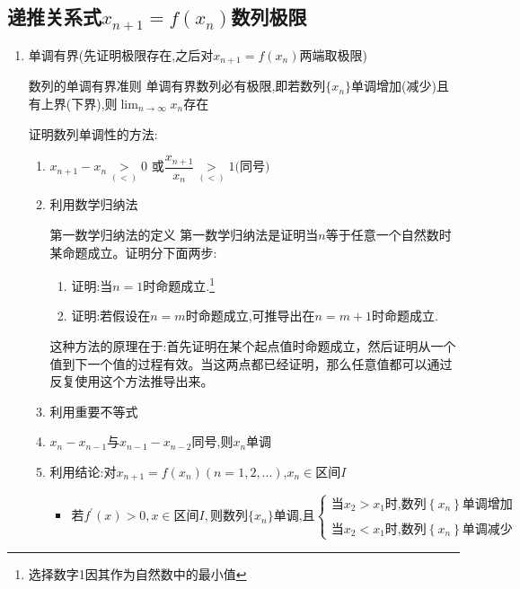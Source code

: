 \documentclass[8pt a4paper, oneside, UTF8]{ctexbook}
\begin{document}
\begin{sloppypar}
    \subsection{递推关系式\texorpdfstring{$x_{n+1}=f(x_n)$}的数列极限}
    \begin{enumerate}
        \item 单调有界(先证明极限存在,之后对$x_{n+1}=f(x_n)$两端取极限)
        \begin{them}{数列的单调有界准则}{}
            单调有界数列必有极限,即若数列$\{x_n\}$单调增加(减少)且有上界(下界),则$\lim_{n \to \infty} x_n$存在
        \end{them}
        证明数列单调性的方法:
            \begin{enumerate}
                \item $x_{n+1}-x_{n}\underset{(<)}{\operatorname*{>}}0\text{ 或}\dfrac{x_{n+1}}{x_{n}}\underset{(<)}{\operatorname*{>}}1\text{(同号})$
                \item 利用数学归纳法
                \begin{defn}{第一数学归纳法的定义}{}
                    第一数学归纳法是证明当$n$等于任意一个自然数时某命题成立。证明分下面两步:
                    \begin{enumerate}
                        \item 证明:当$n=1$时命题成立.\footnote{选择数字1因其作为自然数中的最小值}
                        \item 证明:若假设在$n=m$时命题成立,可推导出在$n=m+1$时命题成立.
                    \end{enumerate}
                    这种方法的原理在于:首先证明在某个起点值时命题成立，然后证明从一个值到下一个值的过程有效。当这两点都已经证明，那么任意值都可以通过反复使用这个方法推导出来。
                \end{defn}
                \item 利用重要不等式
                \item $x_n-x_{n-1}$与$x_{n-1}-x_{n-2}$同号,则${x_n}$单调
                \item 利用结论:对$x_{n+1}=f(x_n)(n=1,2,...)$,$x_n \in \text{区间}I$
                \begin{itemize}
                    \item $\text{若} f^{\prime}(x) > 0, x \in \text{区间}I, \text{则数列} \{x_n\} \text{单调,且}\left\{\begin{array}{l}\text{当}x_2>x_1\text{时,数列}\left\{x_n\right\}\text{单调增加}\\\\\text{当}x_2<x_1\text{时,数列}\left\{x_n\right\}\text{单调减少}\end{array}\right.$

\end{itemize}
\end{enumerate}
\end{enumerate}
\end{sloppypar}
\end{document}
